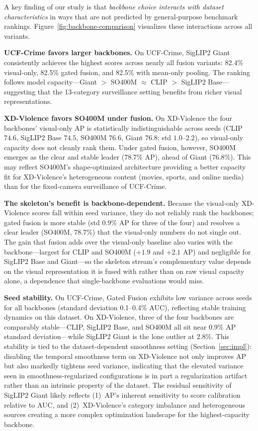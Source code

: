 \documentclass[sigconf]{acmart}
\begin{document}
A key finding of our study is that \emph{backbone choice interacts with dataset characteristics} in ways that are not predicted by general-purpose benchmark rankings. Figure~\ref{fig:backbone-comparison} visualizes these interactions across all variants.

\textbf{UCF-Crime favors larger backbones.} On UCF-Crime, SigLIP2 Giant consistently achieves the highest scores across nearly all fusion variants: 82.4\% visual-only, 82.5\% gated fusion, and 82.5\% with mean-only pooling. The ranking follows model capacity---Giant $>$ SO400M $\approx$ CLIP $>$ SigLIP2 Base---suggesting that the 13-category surveillance setting benefits from richer visual representations.

\textbf{XD-Violence favors SO400M under fusion.} On XD-Violence the four backbones' visual-only AP is statistically indistinguishable across seeds (CLIP $74.6$, SigLIP2 Base $74.5$, SO400M $76.6$, Giant $76.8$; std $1.0$--$2.2$), so visual-only capacity does not cleanly rank them. Under gated fusion, however, SO400M emerges as the clear and stable leader ($78.7$\% AP), ahead of Giant ($76.8$\%). This may reflect SO400M's shape-optimized architecture providing a better capacity fit for XD-Violence's heterogeneous content (movies, sports, and online media) than for the fixed-camera surveillance of UCF-Crime.

\textbf{The skeleton's benefit is backbone-dependent.} Because the visual-only XD-Violence scores fall within seed variance, they do not reliably rank the backbones; gated fusion is more stable (std $0.9$\% AP for three of the four) and resolves a clear leader (SO400M, $78.7$\%) that the visual-only numbers do not single out. The gain that fusion adds over the visual-only baseline also varies with the backbone---largest for CLIP and SO400M ($+1.9$ and $+2.1$ AP) and negligible for SigLIP2 Base and Giant---so the skeleton stream's complementary value depends on the visual representation it is fused with rather than on raw visual capacity alone, a dependence that single-backbone evaluations would miss.

\textbf{Seed stability.} On UCF-Crime, Gated Fusion exhibits low variance across seeds for all backbones (standard deviation 0.1--0.4\% AUC), reflecting stable training dynamics on this dataset. On XD-Violence, three of the four backbones are comparably stable---CLIP, SigLIP2 Base, and SO400M all sit near 0.9\% AP standard deviation---while SigLIP2 Giant is the lone outlier at 2.8\%. This stability is tied to the dataset-dependent smoothness setting (Section~\ref{sec:impl}): disabling the temporal smoothness term on XD-Violence not only improves AP but also markedly tightens seed variance, indicating that the elevated variance seen in smoothness-regularized configurations is in part a regularization artifact rather than an intrinsic property of the dataset. The residual sensitivity of SigLIP2 Giant likely reflects (1)~AP's inherent sensitivity to score calibration relative to AUC, and (2)~XD-Violence's category imbalance and heterogeneous sources creating a more complex optimization landscape for the highest-capacity backbone.
\end{document}
